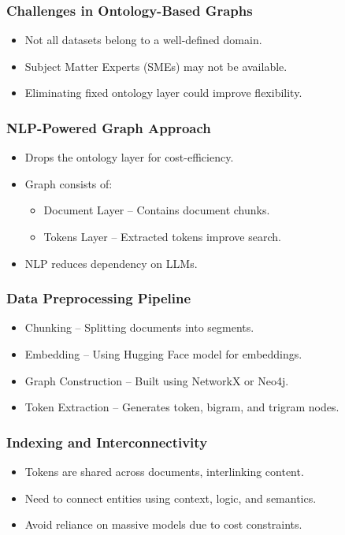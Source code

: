 \begin{frame}[fragile]\frametitle{Challenges in Ontology-Based Graphs}
    \begin{itemize}
        \item Not all datasets belong to a well-defined domain.
        \item Subject Matter Experts (SMEs) may not be available.
        \item Eliminating fixed ontology layer could improve flexibility.
    \end{itemize}
\end{frame}

\begin{frame}[fragile]\frametitle{NLP-Powered Graph Approach}
    \begin{itemize}
        \item Drops the ontology layer for cost-efficiency.
        \item Graph consists of:
        \begin{itemize}
            \item Document Layer – Contains document chunks.
            \item Tokens Layer – Extracted tokens improve search.
        \end{itemize}
        \item NLP reduces dependency on LLMs.
    \end{itemize}
\end{frame}

\begin{frame}[fragile]\frametitle{Data Preprocessing Pipeline}
    \begin{itemize}
        \item Chunking – Splitting documents into segments.
        \item Embedding – Using Hugging Face model for embeddings.
        \item Graph Construction – Built using NetworkX or Neo4j.
        \item Token Extraction – Generates token, bigram, and trigram nodes.
    \end{itemize}
\end{frame}

\begin{frame}[fragile]\frametitle{Indexing and Interconnectivity}
    \begin{itemize}
        \item Tokens are shared across documents, interlinking content.
        \item Need to connect entities using context, logic, and semantics.
        \item Avoid reliance on massive models due to cost constraints.
    \end{itemize}
\end{frame}

